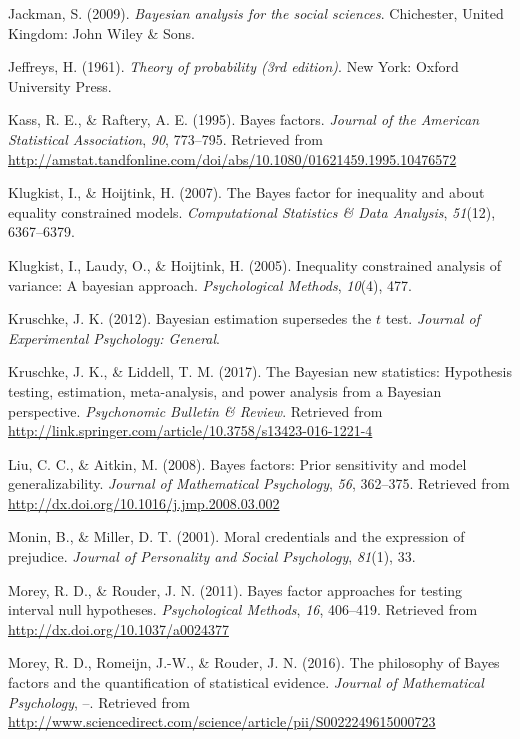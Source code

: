 \documentclass[english,man]{apa6}
\theoremstyle{definition}
\theoremstyle{definition}
\theoremstyle{remark}
\begin{document}
\hypertarget{ref-Jackman:2009}{}
Jackman, S. (2009). \emph{Bayesian analysis for the social sciences}.
Chichester, United Kingdom: John Wiley \& Sons.

\hypertarget{ref-Jeffreys:1961}{}
Jeffreys, H. (1961). \emph{Theory of probability (3rd edition)}. New
York: Oxford University Press.

\hypertarget{ref-Kass:Raftery:1995}{}
Kass, R. E., \& Raftery, A. E. (1995). Bayes factors. \emph{Journal of
the American Statistical Association}, \emph{90}, 773--795. Retrieved
from
\url{http://amstat.tandfonline.com/doi/abs/10.1080/01621459.1995.10476572}

\hypertarget{ref-Klugkist:Hoijtink:2007}{}
Klugkist, I., \& Hoijtink, H. (2007). The Bayes factor for inequality
and about equality constrained models. \emph{Computational Statistics \&
Data Analysis}, \emph{51}(12), 6367--6379.

\hypertarget{ref-Klugkist:etal:2005}{}
Klugkist, I., Laudy, O., \& Hoijtink, H. (2005). Inequality constrained
analysis of variance: A bayesian approach. \emph{Psychological Methods},
\emph{10}(4), 477.

\hypertarget{ref-Kruschke:2012}{}
Kruschke, J. K. (2012). Bayesian estimation supersedes the \(t\) test.
\emph{Journal of Experimental Psychology: General}.

\hypertarget{ref-Kruschke:Liddell:2017}{}
Kruschke, J. K., \& Liddell, T. M. (2017). The Bayesian new statistics:
Hypothesis testing, estimation, meta-analysis, and power analysis from a
Bayesian perspective. \emph{Psychonomic Bulletin \& Review}. Retrieved
from \url{http://link.springer.com/article/10.3758/s13423-016-1221-4}

\hypertarget{ref-Liu:Aitkin:2008}{}
Liu, C. C., \& Aitkin, M. (2008). Bayes factors: Prior sensitivity and
model generalizability. \emph{Journal of Mathematical Psychology},
\emph{56}, 362--375. Retrieved from
\url{http://dx.doi.org/10.1016/j.jmp.2008.03.002}

\hypertarget{ref-Monin:Miller:2001}{}
Monin, B., \& Miller, D. T. (2001). Moral credentials and the expression
of prejudice. \emph{Journal of Personality and Social Psychology},
\emph{81}(1), 33.

\hypertarget{ref-Morey:Rouder:2011}{}
Morey, R. D., \& Rouder, J. N. (2011). Bayes factor approaches for
testing interval null hypotheses. \emph{Psychological Methods},
\emph{16}, 406--419. Retrieved from
\url{http://dx.doi.org/10.1037/a0024377}

\hypertarget{ref-Morey:etal:2016}{}
Morey, R. D., Romeijn, J.-W., \& Rouder, J. N. (2016). The philosophy of
Bayes factors and the quantification of statistical evidence.
\emph{Journal of Mathematical Psychology}, --. Retrieved from
\url{http://www.sciencedirect.com/science/article/pii/S0022249615000723}
\end{document}

